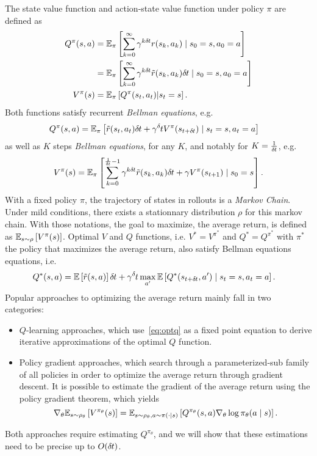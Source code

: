 The state value function and action-state value function under policy
$\pi$ are defined as
\begin{align}
	Q^\pi(s, a) &= \mathbb{E}_\pi\left[
		\sum\limits_{k=0}^\infty
	{\gamma}^{k \delta\hspace{-.06em}t} r(s_k, a_k)
		\mid
		s_0 = s, a_0 = a
	\right]\\
	&= \mathbb{E}_\pi\left[
		\sum\limits_{k=0}^\infty
		{\gamma}^{k \delta\hspace{-.06em}t} \tilde{r}(s_k, a_k) \delta\hspace{-.06em}t
		\mid
		s_0 = s, a_0 = a
	\right]\\
	V^\pi(s) &= \mathbb{E}_\pi\left[Q^\pi(s_t, a_t) | s_t=s\right].
\end{align}
Both functions satisfy recurrent \emph{Bellman equations}, e.g.
\begin{align}
	Q^\pi(s, a) &= \BE_\pi\left[
		\tilde{r}(s_t, a_t) \deltat + \gamma^\deltat V^\pi(s_{t + \deltat})
		\mid
	s_t = s, a_t = a\right]
\end{align}
as well as $K$ steps \emph{Bellman equations}, for any $K$, and notably for
$K = \frac{1}{\delta\hspace{-.06em}t}$, e.g.
\begin{align}
	V^\pi(s) = \mathbb{E}_\pi\left[
		\sum\limits_{k=0}^{\frac{1}{\delta\hspace{-.06em}t} - 1} \gamma^{k\delta\hspace{-.06em}t} \tilde{r}(s_k, a_k) \delta\hspace{-.06em}t + \gamma V^\pi(s_{t + 1})
		\mid
	s_0 = s\right].
\end{align}
With a fixed policy $\pi$, the trajectory of states in rollouts is a
\emph{Markov Chain}. Under mild conditions, there exists a stationnary
distribution $\rho$ for this markov chain. With those notations, the goal to
maximize, the average return, is defined as
$\mathbb{E}_{s\sim\rho}\left[V^{\pi}(s)\right]$.
Optimal $V$ and $Q$ functions, i.e. $V^*=V^{\pi^*}$ and $Q^*=Q^{\pi^*}$ with
$\pi^*$ the policy that maximizes the average return, also satisfy Bellman equations
equations, i.e.
\begin{align}
	Q^*(s, a) &= \BE\left[
		\tilde{r}(s, a) \right] \deltat + \gamma^\deltat \max\limits_{a'} \BE\left[Q^*(s_{t + \deltat}, a')
		\mid
	s_t = s, a_t = a\right].
	\label{eq:optq}
\end{align}
Popular approaches to optimizing
the average return mainly fall in two categories:
\begin{itemize}
	\item $Q$-learning approaches, which use~\eqref{eq:optq} as a fixed point equation
		to derive iterative approximations of the optimal $Q$ function.
	\item Policy gradient approaches, which search through a parameterized-sub family of
		all policies in order to optimize the average return through gradient descent. 
		It is possible to estimate the gradient of the average return
		using the policy gradient theorem, which yields
		\begin{equation}
			\label{eq:policygradient}
			\nabla_\theta\mathbb{E}_{s\sim\rho_\theta}\left[V^{\pi_\theta}(s)\right]
			=
			\mathbb{E}_{s\sim\rho_\theta, a\sim\pi(\cdot\mid s)}\left[
				Q^{\pi_\theta}(s, a)
				\nabla_\theta \log \pi_\theta(a \mid s)
			\right].
		\end{equation}
\end{itemize}
Both approaches require estimating $Q^{\pi_\theta}$, and we will show that these
estimations need to be precise up to $O (\delta\hspace{-.06em}t)$.

